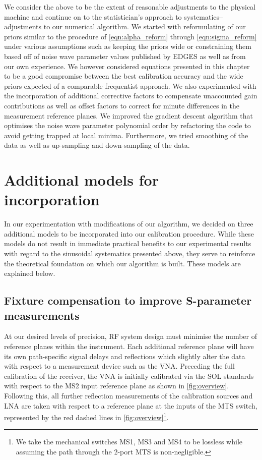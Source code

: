 We consider the above to be the extent of reasonable adjustments to the physical machine and continue on to the statistician’s approach to systematics--adjustments to our numerical algorithm. We started with reformulating of our priors similar to the procedure of \cref{eqn:alpha_reform} through \cref{eqn:sigma_reform} under various assumptions such as keeping the priors wide or constraining them based off of noise wave parameter values published by EDGES as well as from our own experience. We however considered equations presented in this chapter to be a good compromise between the best calibration accuracy and the wide priors expected of a comparable frequentist approach. We also experimented with the incorporation of additional corrective factors to compensate unaccounted gain contributions as well as offset factors to correct for minute differences in the measurement reference planes. We improved the gradient descent algorithm that optimises the noise wave parameter polynomial order by refactoring the code to avoid getting trapped at local minima. Furthermore, we tried smoothing of the data as well as up-sampling and down-sampling of the data.

\section{Additional models for incorporation}
In our experimentation with modifications of our algorithm, we decided on three additional models to be incorporated into our calibration procedure. While these models do not result in immediate practical benefits to our experimental results with regard to the sinusoidal systematics presented above, they serve to reinforce the theoretical foundation on which our algorithm is built. These models are explained below.

\subsection{Fixture compensation to improve S-parameter measurements}\label{sec:tparameters}
At our desired levels of precision, RF system design must minimise the number of reference planes within the instrument. Each additional reference plane will have its own path-specific signal delays and reflections which slightly alter the data with respect to a measurement device such as the VNA. Preceding the full calibration of the receiver, the VNA is initially calibrated via the SOL standards with respect to the MS2 input reference plane as shown in \cref{fig:overview}. Following this, all further reflection measurements of the calibration sources and LNA are taken with respect to a reference plane at the inputs of the MTS switch, represented by the red dashed lines in \cref{fig:overview}\footnote{We take the mechanical switches MS1, MS3 and MS4 to be lossless while assuming the path through the 2-port MTS is non-negligible.}.

